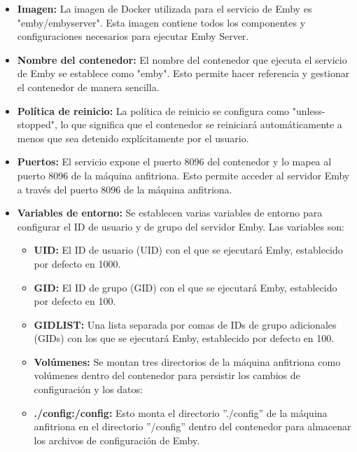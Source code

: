 		\begin{itemize}
		
		\item \textbf{Imagen:} La imagen de Docker utilizada para el servicio de Emby es "emby/embyserver". Esta imagen contiene todos los componentes y configuraciones necesarios para ejecutar Emby Server.
	
		\item \textbf{Nombre del contenedor:} El nombre del contenedor que ejecuta el servicio de Emby se establece como "emby". Esto permite hacer referencia y gestionar el contenedor de manera sencilla.
	
		\item \textbf{Política de reinicio:} La política de reinicio se configura como "unless-stopped", lo que significa que el contenedor se reiniciará automáticamente a menos que sea detenido explícitamente por el usuario.
	
		\item  \textbf{Puertos:} El servicio expone el puerto 8096 del contenedor y lo mapea al puerto 8096 de la máquina anfitriona. Esto permite acceder al servidor Emby a través del puerto 8096 de la máquina anfitriona.
	
		\item  \textbf{Variables de entorno:} Se establecen varias variables de entorno para configurar el ID de usuario y de grupo del servidor Emby. Las variables son:
		
		\begin{itemize}
		
			\item \textbf{UID:} El ID de usuario (UID) con el que se ejecutará Emby, establecido por defecto en 1000.
		
			\item \textbf{GID:} El ID de grupo (GID) con el que se ejecutará Emby, establecido por defecto en 100.
		
			\item \textbf{GIDLIST:} Una lista separada por comas de IDs de grupo adicionales (GIDs) con los que se ejecutará Emby, establecido por defecto en 100.
			
			\item \textbf{Volúmenes:} Se montan tres directorios de la máquina anfitriona como volúmenes dentro del contenedor para persistir los cambios de configuración y los datos:
			
			\item \textbf{./config:/config:} Esto monta el directorio ''./config'' de la máquina anfitriona en el directorio ''/config'' dentro del contenedor para almacenar los archivos de configuración de Emby.
	

\end{itemize}
\end{itemize}
